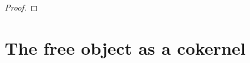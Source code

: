 \documentclass{amsbook} %
\newenvironment{eq*}{\begin{equation*}}{\end{equation*}}
\numberwithin{section}{chapter}
\begin{document}
\begin{proof}
%
\end{proof}


\section{The free object as a cokernel}
\label{colimalgebra} 
\end{document}
